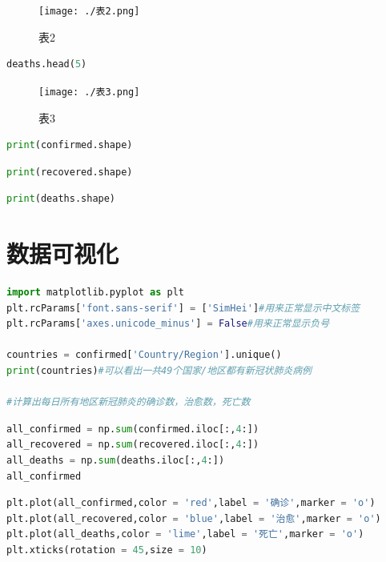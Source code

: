 \documentclass[UTF8,a4paper,12pt]{ctexart}  %
\begin{document}
\begin{figure}
\centering
\texttt{[image: ./表2.png]}
\caption{表2}
\end{figure}

\begin{lstlisting}[language=Python]
deaths.head(5)
\end{lstlisting}

\begin{figure}
\centering
\texttt{[image: ./表3.png]}
\caption{表3}
\end{figure}

\begin{lstlisting}[language=Python]
print(confirmed.shape)
\end{lstlisting}

\begin{lstlisting}[language=Python]
print(recovered.shape)
\end{lstlisting}

\begin{lstlisting}[language=Python]
print(deaths.shape)
\end{lstlisting}

\section{数据可视化}

\begin{lstlisting}[language=Python]
import matplotlib.pyplot as plt
plt.rcParams['font.sans-serif'] = ['SimHei']#用来正常显示中文标签
plt.rcParams['axes.unicode_minus'] = False#用来正常显示负号

countries = confirmed['Country/Region'].unique()
print(countries)#可以看出一共49个国家/地区都有新冠状肺炎病例

#计算出每日所有地区新冠肺炎的确诊数，治愈数，死亡数
\end{lstlisting}

\begin{lstlisting}[language=Python]
all_confirmed = np.sum(confirmed.iloc[:,4:])
all_recovered = np.sum(recovered.iloc[:,4:])
all_deaths = np.sum(deaths.iloc[:,4:])
all_confirmed
\end{lstlisting}

\begin{lstlisting}[language=Python]
plt.plot(all_confirmed,color = 'red',label = '确诊',marker = 'o')
plt.plot(all_recovered,color = 'blue',label = '治愈',marker = 'o')
plt.plot(all_deaths,color = 'lime',label = '死亡',marker = 'o')
plt.xticks(rotation = 45,size = 10)
\end{lstlisting}
\end{document}

